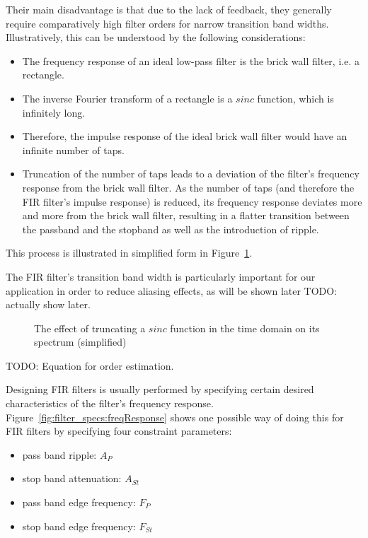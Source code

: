 Their  main  disadvantage   is  that  due  to  the  lack   of  feedback,  they
generally require comparatively high filter  orders for narrow transition band
widths. Illustratively, this can be understood by the following considerations:
\begin{itemize}\tightlist
    \item
        The frequency response of an ideal low-pass filter is the brick wall
        filter, i.e. a rectangle.
    \item
        The inverse  Fourier transform  of a rectangle  is a  $sinc$ function,
        which is infinitely long.
    \item
        Therefore, the impulse  response of the ideal brick  wall filter would
        have an infinite number of taps.
    \item
        Truncation of the number of taps  leads to a deviation of the filter's
        frequency response from the brick wall  filter.  As the number of taps
        (and  therefore the  FIR filter's  impulse response)  is reduced,  its
        frequency response deviates more and  more from the brick wall filter,
        resulting  in  a  flatter  transition between  the  passband  and  the
        stopband as well as the introduction of ripple.
\end{itemize}

This     process     is     illustrated      in     simplified     form     in
Figure~\ref{fig:brick_wall_vs_FIR}.

The  FIR filter's  transition band  width  is particularly  important for  our
application in order to reduce aliasing effects, as will be shown later {TODO:
actually show later}.

\begin{figure}
    \centering
    
    \caption[Brick Wall Filter vs. FIR Filter (simplified)]{%
        The effect of  truncating a $sinc$ function in the  time domain on its
        spectrum (simplified)%
    }
    \label{fig:brick_wall_vs_FIR}
\end{figure}

TODO: Equation for order estimation.

Designing    FIR    filters    is     usually    performed    by    specifying
certain     desired    characteristics     of    the     filter's    frequency
response. Figure~\ref{fig:filter_specs:freqResponse} shows one possible way of
doing this for FIR filters by specifying four constraint parameters:
\begin{itemize}\tightlist
    \item
        pass band ripple: $A_P$
    \item
        stop band attenuation: $A_{St}$
    \item
        pass band edge frequency: $F_P$
    \item
        stop band edge frequency: $F_{St}$
\end{itemize}

